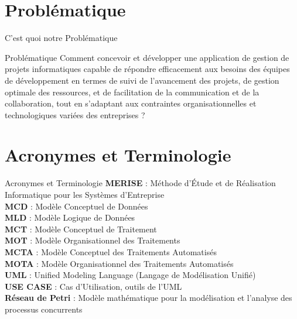 \documentclass{beamer}
\begin{document}
\section{Problématique}
\begin{frame}{C'est quoi notre Problématique}
    \begin{block}{Problématique}
        Comment concevoir et développer une application de gestion de projets informatiques capable de répondre efficacement aux besoins des équipes de développement en termes de suivi de l'avancement des projets, de gestion optimale des ressources, et de facilitation de la communication et de la collaboration, tout en s'adaptant aux contraintes organisationnelles et technologiques variées des entreprises ?
    \end{block}
\end{frame}

\section{Acronymes et Terminologie}
\begin{frame}{Acronymes et Terminologie}
    \textbf{MERISE} : Méthode d'Étude et de Réalisation Informatique pour les Systèmes d'Entreprise \\
    \textbf{MCD} : Modèle Conceptuel de Données \\
    \textbf{MLD} : Modèle Logique de Données \\
    \textbf{MCT} : Modèle Conceptuel de Traitement \\
    \textbf{MOT} : Modèle Organisationnel des Traitements \\
    \textbf{MCTA} : Modèle Conceptuel des Traitements Automatisés \\
    \textbf{MOTA} : Modèle Organisationnel des Traitements Automatisés \\
    \textbf{UML} : Unified Modeling Language (Langage de Modélisation Unifié) \\
    \textbf{USE CASE} : Cas d’Utilisation, outils de l'UML \\
    \textbf{Réseau de Petri} : Modèle mathématique pour la modélisation et l’analyse des processus concurrents \\
\end{frame}
\end{document}
